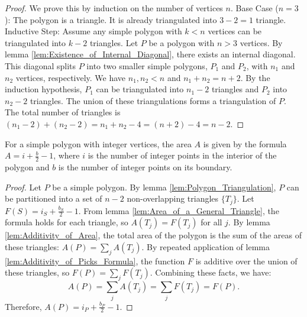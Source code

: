 \begin{proof}
    We prove this by induction on the number of vertices $n$.
    Base Case ($n=3$): The polygon is a triangle. It is already triangulated into $3-2=1$ triangle.
    Inductive Step: Assume any simple polygon with $k < n$ vertices can be triangulated into $k-2$ triangles. Let $P$ be a polygon with $n > 3$ vertices. By lemma \ref{lem:Existence_of_Internal_Diagonal}, there exists an internal diagonal. This diagonal splits $P$ into two smaller simple polygons, $P_1$ and $P_2$, with $n_1$ and $n_2$ vertices, respectively. We have $n_1, n_2 < n$ and $n_1+n_2 = n+2$.
    By the induction hypothesis, $P_1$ can be triangulated into $n_1-2$ triangles and $P_2$ into $n_2-2$ triangles. The union of these triangulations forms a triangulation of $P$.
    The total number of triangles is $(n_1-2) + (n_2-2) = n_1+n_2-4 = (n+2)-4 = n-2$.
\end{proof}

\begin{theorem}
    \label{thm:Picks_Theorem}
    For a simple polygon with integer vertices, the area $A$ is given by the formula $A = i + \frac{b}{2} - 1$, where $i$ is the number of integer points in the interior of the polygon and $b$ is the number of integer points on its boundary.
\end{theorem}

\begin{proof}
    Let $P$ be a simple polygon. By lemma \ref{lem:Polygon_Triangulation}, $P$ can be partitioned into a set of $n-2$ non-overlapping triangles $\{T_j\}$.
    Let $F(S) = i_S + \frac{b_S}{2} - 1$.
    From lemma \ref{lem:Area_of_a_General_Triangle}, the formula holds for each triangle, so $A(T_j) = F(T_j)$ for all $j$.
    By lemma \ref{lem:Additivity_of_Area}, the total area of the polygon is the sum of the areas of these triangles: $A(P) = \sum_{j} A(T_j)$.
    By repeated application of lemma \ref{lem:Additivity_of_Picks_Formula}, the function $F$ is additive over the union of these triangles, so $F(P) = \sum_{j} F(T_j)$.
    Combining these facts, we have:
    \[
        A(P) = \sum_{j} A(T_j) = \sum_{j} F(T_j) = F(P).
    \]
    Therefore, $A(P) = i_P + \frac{b_P}{2} - 1$.
\end{proof}